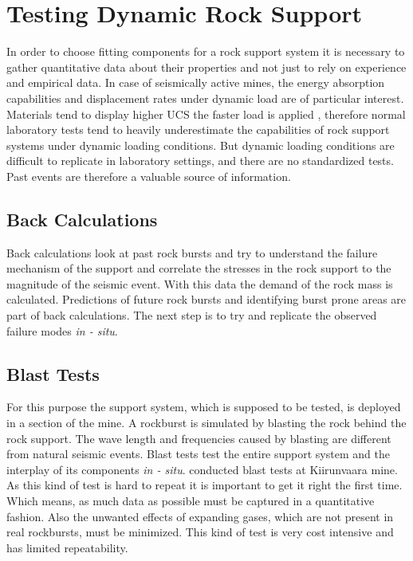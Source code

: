 \chapter{Testing Dynamic Rock Support}

In order to choose fitting components for a rock support system it is necessary to gather quantitative data about their properties and not just to rely on experience and empirical data. In case of seismically active mines, the energy absorption capabilities and displacement rates under dynamic load are of particular interest. Materials tend to display higher UCS the faster load is applied \autocite[4.28]{canada96}, therefore normal laboratory tests tend to heavily underestimate the capabilities of rock support systems under dynamic loading conditions. But dynamic loading conditions are difficult to replicate in laboratory settings, and there are no standardized tests. Past events are therefore a valuable source of information.

\section{Back Calculations}

Back calculations look at past rock bursts and try to understand the failure mechanism of the support and correlate the stresses in the rock support to the magnitude of the seismic event. \autocite{Potvin10} With this data the demand of the rock mass is calculated. Predictions of future rock bursts and identifying burst prone areas are part of back calculations. \autocite{Heal10} The next step is to try and replicate the observed failure modes \textit{in - situ}.

\section{Blast Tests}

For this purpose the support system, which is supposed to be tested, is deployed in a section of the mine. A rockburst is simulated by blasting the rock behind the rock support. \autocite[98]{Heal10}
 The wave length and frequencies caused by blasting are different from natural seismic events. Blast tests test the entire support system and the interplay of its components \textit{in - situ}. \autocite[243]{Potvin10} \textcite{shirzadegan16} conducted blast tests at Kiirunvaara mine.
As this kind of test is hard to repeat it is important to get it right the first time. Which means, as much data as possible must be captured in a quantitative fashion. Also the unwanted effects of expanding gases, which are not present in real rockbursts, must be minimized. \autocite[98]{Heal10}
This kind of test is very cost intensive and has limited repeatability.

